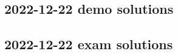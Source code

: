 \documentclass[11pt, a4paper]{article}
\theoremstyle{definition}
\begin{document}


\subsection{2022-12-22 demo solutions}


\subsection{2022-12-22 exam solutions}
\end{document}
